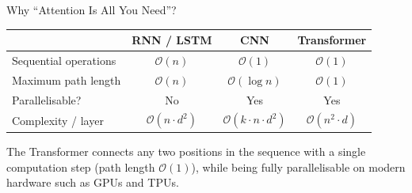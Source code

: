 \documentclass[aspectratio=169]{beamer}
\begin{document}
\begin{frame}{Why ``Attention Is All You Need''?}
  \begin{center}
  {\small
  \begin{tabular}{lccc}
    \toprule
    & \textbf{RNN / LSTM} & \textbf{CNN} & \textbf{Transformer} \\
    \midrule
    Sequential operations  & $\mathcal{O}(n)$         & $\mathcal{O}(1)$         & $\mathcal{O}(1)$ \\
    Maximum path length    & $\mathcal{O}(n)$         & $\mathcal{O}(\log n)$    & $\mathcal{O}(1)$ \\
    Parallelisable?        & No                       & Yes                      & Yes \\
    Complexity / layer     & $\mathcal{O}(n\cdot d^2)$ & $\mathcal{O}(k\cdot n\cdot d^2)$ & $\mathcal{O}(n^2\cdot d)$ \\
    \bottomrule
  \end{tabular}}
  \end{center}

  \vspace{0.5em}
  The Transformer connects any two positions in the sequence with a single computation
  step (path length $\mathcal{O}(1)$), while being fully parallelisable on modern
  hardware such as GPUs and TPUs.
\end{frame}
%
\end{document}
